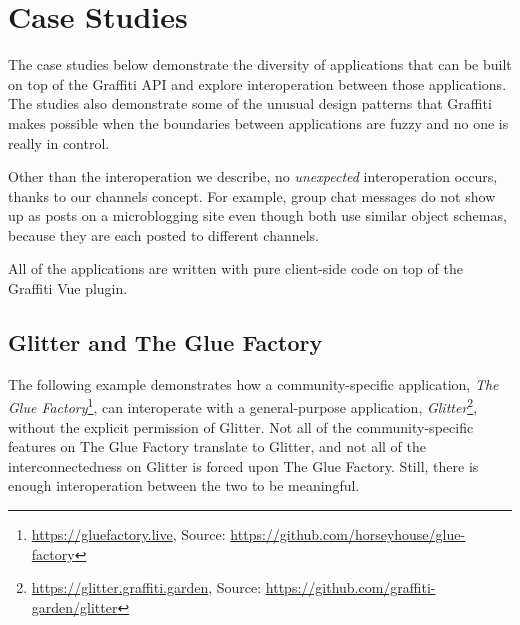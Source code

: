 \section{Case Studies}
\label{case-studies}


The case studies below demonstrate the diversity of applications
that can be built on top of the Graffiti API and explore interoperation
between those applications.
The studies also demonstrate some of the unusual design patterns that
Graffiti makes possible when the boundaries between applications
are fuzzy and no one is really in control.

Other than the interoperation we describe, no \emph{unexpected}
interoperation occurs, thanks to our channels concept.
For example, group chat messages do not show up as posts on
a microblogging site even though both use similar object schemas,
because they are each posted to different channels.

All of the applications are written with pure client-side code on
top of the Graffiti Vue plugin.

\subsection{Glitter and The Glue Factory}

The following example demonstrates how a community-specific application,
\emph{The Glue Factory}\footnote{
\url{https://gluefactory.live}, Source: \url{https://github.com/horseyhouse/glue-factory}
}, can interoperate with a general-purpose application, \emph{Glitter}\footnote{
\url{https://glitter.graffiti.garden}, Source: \url{https://github.com/graffiti-garden/glitter}
},
without the explicit permission of Glitter.
Not all of the community-specific features on The Glue Factory
translate to Glitter, and not all of the interconnectedness on Glitter
is forced upon The Glue Factory.
Still, there is enough interoperation between the two to be meaningful.

